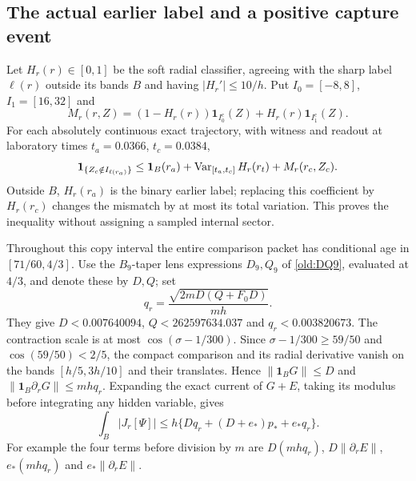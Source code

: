 \documentclass[11pt]{article}
\theoremstyle{definition}\newtheorem{definition}[theorem]{Definition}
\theoremstyle{remark}\newtheorem{remark}[theorem]{Remark}
\newcommand{\one}{\mathbf1}\newcommand{\R}{\mathbb R}\newcommand{\T}{\mathbb T}
\begin{document}
\subsection{The actual earlier label and a positive capture event}
\label{hold:copy}
Let $H_r(r)\in[0,1]$ be the soft radial classifier, agreeing with the
sharp label $\ell(r)$ outside its bands $B$ and having
$|H_r'|\leq10/h$.  Put $I_0=[-8,8]$, $I_1=[16,32]$ and
\[
 M_r(r,Z)=(1-H_r(r))\one_{I_0^c}(Z)+H_r(r)\one_{I_1^c}(Z).
\]
For each absolutely continuous exact trajectory, with witness and
readout at laboratory times $t_a=0.0366$, $t_c=0.0384$,
\begin{equation}\label{hold:pathineq}
 \one_{\{Z_c\notin I_{\ell(r_a)}\}}
 \leq\one_B(r_a)+\Var_{[t_a,t_c]}H_r(r_t)+M_r(r_c,Z_c).
\end{equation}
Outside $B$, $H_r(r_a)$ is the binary earlier label; replacing this
coefficient by $H_r(r_c)$ changes the mismatch by at most its total
variation.  This proves the inequality without assigning a sampled
internal sector.

Throughout this copy interval the entire comparison packet has
conditional age in $[71/60,4/3]$.  Use the $B_9$-taper lens
expressions $D_9,Q_9$ of \eqref{old:DQ9}, evaluated at $4/3$,
and denote these by $D,Q$; set
\begin{equation}\label{hold:lensvalues}
 q_r=\frac{\sqrt{2mD(Q+F_0D)}}{mh}.
\end{equation}
They give $D<0.007640094$, $Q<262597634.037$ and
$q_r<0.003820673$.  The contraction scale is at most
$\cos(\sigma-1/300)$.  Since $\sigma-1/300\geq59/50$ and
$\cos(59/50)<2/5$, the compact comparison and its radial derivative
vanish on the bands $[h/5,3h/10]$ and their translates.  Hence
$\|\one_BG\|\leq D$ and $\|\one_B\partial_rG\|\leq mhq_r$.
Expanding the exact current of $G+E$, taking its modulus before
integrating any hidden variable, gives
\begin{equation}\label{hold:bandcurrent}
 \int_B|J_r[\Psi]|\leq
 h\{Dq_r+(D+e_*)p_*+e_*q_r\}.
\end{equation}
For example the four terms before division by $m$ are
$D(mhq_r)$, $D\|\partial_rE\|$,
$e_*(mhq_r)$ and $e_*\|\partial_rE\|$.
\end{document}

